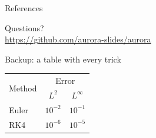 \documentclass[aspectratio=169,xcolor=table]{beamer}
\begin{document}
\begin{frame}[allowframebreaks]{References}
  
  
\end{frame}

\begin{frame}[plain,c]
  \begin{center}
    {\Huge Questions?}\\[1em]
    \url{https://github.com/aurora-slides/aurora}
  \end{center}
\end{frame}

\appendix
\begin{frame}[noframenumbering]{Backup: a table with every trick}
  \begin{tabular}{l|cc}
    \toprule
    \multirow{2}{*}{Method} & \multicolumn{2}{c}{Error} \\
                            & $L^2$ & $L^\infty$ \\
    \midrule
    \rowcolor{blue!15} Euler & $10^{-2}$ & $10^{-1}$ \\
    RK4 & $10^{-6}$ & \cellcolor{teal!25}$10^{-5}$ \\
    \bottomrule
  \end{tabular}
\end{frame}
\end{document}
